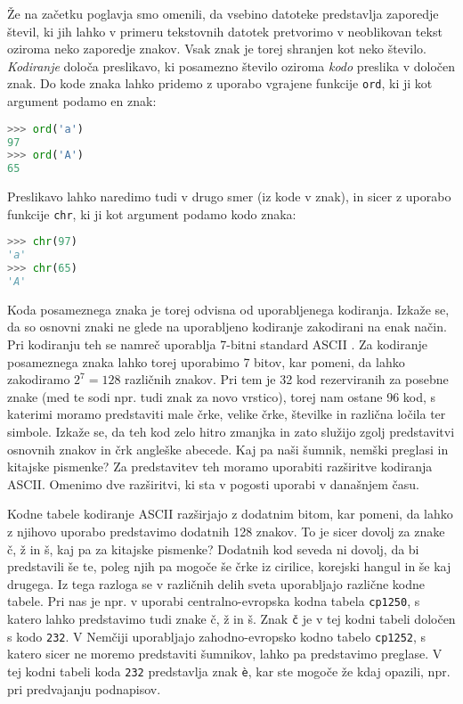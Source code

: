 Že na začetku poglavja smo omenili, da vsebino datoteke predstavlja zaporedje števil, ki jih lahko v primeru tekstovnih datotek pretvorimo v neoblikovan tekst oziroma neko zaporedje znakov. Vsak znak je torej shranjen kot neko število. \emph{Kodiranje} določa preslikavo, ki posamezno število oziroma \emph{kodo} preslika v določen znak. Do kode znaka lahko pridemo z uporabo vgrajene funkcije \texttt{ord}, ki ji kot argument podamo en znak:
\begin{lstlisting}[language=Python, showstringspaces=false]
>>> ord('a')
97
>>> ord('A')
65
\end{lstlisting}
Preslikavo lahko naredimo tudi v drugo smer (iz kode v znak), in sicer z uporabo funkcije \texttt{chr}, ki ji kot argument podamo kodo znaka:
\begin{lstlisting}[language=Python, showstringspaces=false]
>>> chr(97)
'a'
>>> chr(65)
'A'
\end{lstlisting}

Koda posameznega znaka je torej odvisna od uporabljenega kodiranja. Izkaže se, da so osnovni znaki ne glede na uporabljeno kodiranje zakodirani na enak način. Pri kodiranju teh se namreč uporablja 7-bitni standard ASCII . Za kodiranje posameznega znaka lahko torej uporabimo 7 bitov, kar pomeni, da lahko zakodiramo $2^7=128$ različnih znakov. Pri tem je 32 kod rezerviranih za posebne znake (med te sodi npr. tudi znak za novo vrstico), torej nam ostane 96 kod, s katerimi moramo predstaviti male črke, velike črke, številke in različna ločila ter simbole. Izkaže se, da teh kod zelo hitro zmanjka in zato služijo zgolj predstavitvi osnovnih znakov in črk angleške abecede. Kaj pa naši šumnik, nemški preglasi in kitajske pismenke? Za predstavitev teh moramo uporabiti razširitve kodiranja ASCII. Omenimo dve razširitvi, ki sta v pogosti uporabi v današnjem času. 

Kodne tabele  kodiranje ASCII razširjajo z dodatnim bitom, kar pomeni, da lahko z njihovo uporabo predstavimo dodatnih 128 znakov. To je sicer dovolj za znake č, ž in š, kaj pa za kitajske pismenke? Dodatnih kod seveda ni dovolj, da bi predstavili še te, poleg njih pa mogoče še črke iz cirilice, korejski hangul in še kaj drugega. Iz tega razloga se v različnih delih sveta uporabljajo različne kodne tabele. Pri nas je npr. v uporabi centralno-evropska kodna tabela \texttt{cp1250}, s katero lahko predstavimo tudi znake č, ž in š. Znak \texttt{č} je v tej kodni tabeli določen s kodo \texttt{232}. V Nemčiji uporabljajo zahodno-evropsko kodno tabelo \texttt{cp1252}, s katero sicer ne moremo predstaviti šumnikov, lahko pa predstavimo preglase.  V tej kodni tabeli koda \texttt{232} predstavlja znak \texttt{è}, kar ste mogoče že kdaj opazili, npr. pri predvajanju podnapisov.

